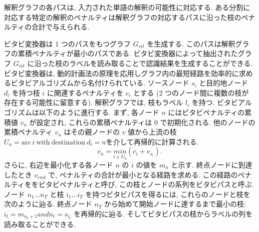 \documentclass[twocolumn]{jarticle}     %
\begin{document}
解釈グラフの各パスは, 入力された単語の解釈の可能性に対応する. ある分割に対応する特定の解釈のペナルティは解釈グラフの対応するパスに沿った枝のペナルティの合計で与えられる.
\par
ビタビ変換器は 1 つのパスをもつグラフ $G_{vit}$ を生成する. このパスは解釈グラフの累積ペナルティが最小のパスである. ビタビ変換器によって抽出されたグラフ $G_{vit}$ に沿った枝のラベルを読み取ることで認識結果を生成することができる. ビタビ変換器は, 動的計画法の原理を応用しグラフ内の最短経路を効率的に求めるビタビアルゴリズムから名付けられている. ソースノード $s_i$ と目的地ノード $d_i$ を持つ枝 $i$ に関連するペナルティを $c_i$ とする (2 つのノード間に複数の枝が存在する可能性に留意する). 解釈グラフでは, 枝もラベル $l_i$ を持つ. ビタビアルゴリズムは以下のように進行する. まず, 各ノード $n$ にはビタビペナルティの累積値 $v_n$ が設定され, これらの累積ペナルティは 0 で初期化される. 他のノードの累積ペナルティ $v_n$ はその親ノードの $v$ 値から上流の枝 $U_n = { \mathrm{arc} \: i \: \mathrm{with   \: destination} \: d_i = n}$を介して再帰的に計算される.
\begin{equation}
  v_n = \underset{i \in U_n}{min} (c_i + v_{s_i}).
\end{equation}   
さらに, 右辺を最小化する各ノード $n$ の $i$ の値を $m_n$ と示す. 終点ノードに到達したとき $v_{end}$ で, ペナルティの合計が最小となる経路を求める. この経路のペナルティををビタビペナルティと呼び, この枝とノードの系列をビタビパスと呼ぶ. ノード $n_1 ... n_T$ と枝 $i_1 ... i_T$ を持つビタビパスを得るには, これらのノードと枝を次のように辿る. 
終点ノード $n_T$ から始めて開始ノードに達するまで最小の枝: $i_t = m_{n_t + 1} and n_t = s_{i_t}$ を再帰的に辿る.
そしてビタビパスの枝からラベルの列を読み取ることができる.
\end{document}
